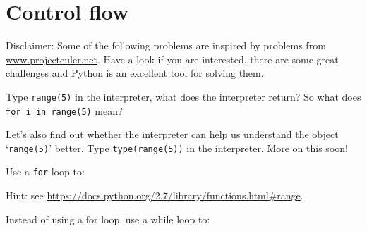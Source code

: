 \section{Control flow} %
\label{sec:control_flow}
Disclaimer: Some of the following problems are inspired by problems from \url{www.projecteuler.net}.
Have a look if you are interested, there are some great challenges and Python is an excellent tool for solving them.


\begin{questions}
    Type \texttt{range(5)} in the interpreter, what does the interpreter return?
    So what does \texttt{for i in range(5)} mean?

    Let's also find out whether the interpreter can help us understand the object `\texttt{range(5)}' better.
    Type \texttt{type(range(5))} in the interpreter.
    More on this soon!

    Use a \texttt{for} loop to:


    Hint: see \url{https://docs.python.org/2.7/library/functions.html#range}.

    Instead of using a for loop, use a while loop to:

\end{questions}
